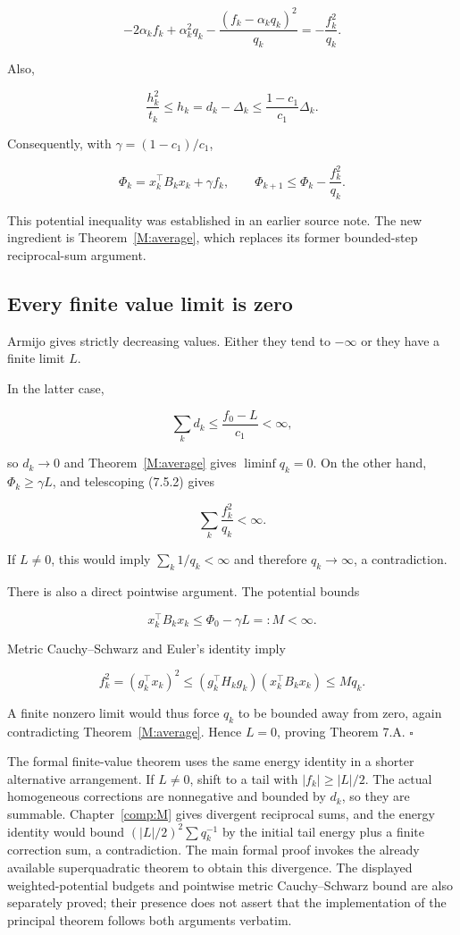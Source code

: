 \[
-2\alpha_k f_k+\alpha_k^2q_k
-\frac{(f_k-\alpha_kq_k)^2}{q_k}
=-\frac{f_k^2}{q_k}.
\]

Also,

\[
\frac{h_k^2}{t_k}\le h_k=d_k-\Delta_k
\le\frac{1-c_1}{c_1}\Delta_k.
\]

Consequently, with \(\gamma=(1-c_1)/c_1\),

\[
\Phi_k=x_k^\top B_kx_k+\gamma f_k,
\qquad
\boxed{\Phi_{k+1}\le\Phi_k-\frac{f_k^2}{q_k}.}
\tag{7.5.2}
\]

This potential inequality was established in an earlier source note. The new
ingredient is Theorem~\ref{M:average}, which replaces its former bounded-step
reciprocal-sum argument.



\subsection{Every finite value limit is
zero}\label{H:every-finite-value-limit-is-zero}

Armijo gives strictly decreasing values. Either they tend to \(-\infty\)
or they have a finite limit \(L\).

In the latter case,

\[
\sum_k d_k\le\frac{f_0-L}{c_1}<\infty,
\]

so \(d_k\to0\) and Theorem~\ref{M:average} gives \(\liminf q_k=0\). On the other hand,
\(\Phi_k\ge\gamma L\), and telescoping (7.5.2) gives

\[
\sum_k\frac{f_k^2}{q_k}<\infty.
\]

If \(L\ne0\), this would imply \(\sum_k1/q_k<\infty\) and therefore
\(q_k\to\infty\), a contradiction.

There is also a direct pointwise argument. The potential bounds

\[
x_k^\top B_kx_k\le\Phi_0-\gamma L=:M<\infty.
\]

Metric Cauchy--Schwarz and Euler's identity imply

\[
f_k^2=(g_k^\top x_k)^2
\le(g_k^\top H_kg_k)(x_k^\top B_kx_k)
\le Mq_k.
\]

A finite nonzero limit would thus force \(q_k\) to be bounded away from
zero, again contradicting Theorem~\ref{M:average}. Hence \(L=0\), proving Theorem 7.A.
\(\square\)

The formal finite-value theorem uses the same energy identity in a shorter alternative arrangement. If \(L\ne0\), shift to a tail with \(|f_k|\ge|L|/2\). The actual homogeneous corrections are nonnegative and bounded by \(d_k\), so they are summable. Chapter~\ref{comp:M} gives divergent reciprocal sums, and the energy identity would bound \((|L|/2)^2\sum q_k^{-1}\) by the initial tail energy plus a finite correction sum, a contradiction. The main formal proof invokes the already available superquadratic theorem to obtain this divergence. The displayed weighted-potential budgets and pointwise metric Cauchy--Schwarz bound are also separately proved; their presence does not assert that the implementation of the principal theorem follows both arguments verbatim.


